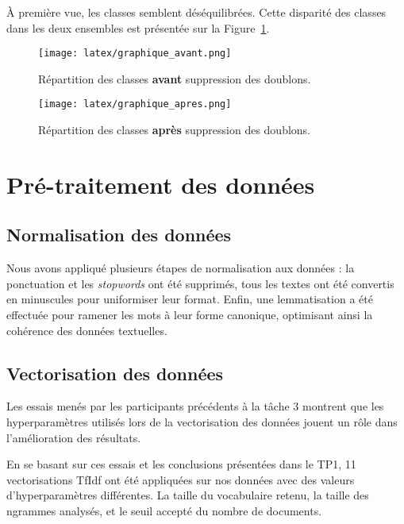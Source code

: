 \documentclass[11pt]{article}
\begin{document}

À première vue, les classes semblent déséquilibrées. Cette disparité des classes dans les deux ensembles est présentée sur la Figure~\ref{fig:graph_avant}.

\begin{figure}[H]
  \texttt{[image: latex/graphique\_avant.png]}
  \caption{Répartition des classes \textbf{avant} suppression des doublons.}
  \label{fig:graph_avant} %
\end{figure}



\begin{figure}[H]
  \texttt{[image: latex/graphique\_apres.png]}
  \caption{Répartition des classes \textbf{après} suppression des doublons.}
  \label{fig:graph_apres} %
\end{figure}


\section{Pré-traitement des données}
\subsection{Normalisation des données}
Nous avons appliqué plusieurs étapes de normalisation aux données : la ponctuation et les \textit{stopwords} ont été supprimés, tous les textes ont été convertis en minuscules pour uniformiser leur format. Enfin, une lemmatisation a été effectuée pour ramener les mots à leur forme canonique, optimisant ainsi la cohérence des données textuelles.

\subsection{Vectorisation des données}
Les essais menés par les participants précédents à la tâche 3 montrent que les hyperparamètres utilisés lors de la vectorisation des données jouent un rôle dans l'amélioration des résultats.

En se basant sur ces essais et les conclusions présentées dans le TP1\cite{TP1}, 11 vectorisations TfIdf ont été appliquées sur nos données avec des valeurs d'hyperparamètres différentes. La taille du vocabulaire retenu, la taille des ngrammes analysés, et le seuil accepté du nombre de documents. 
\end{document}
